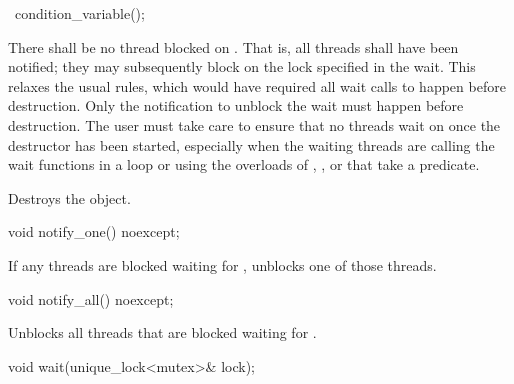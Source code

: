 %
\begin{itemdecl}
~condition_variable();
\end{itemdecl}

\begin{itemdescr}
\pnum
\precondition There shall be no thread blocked on . \enternote That is, all
threads shall have been notified; they may subsequently block on the lock specified in the
wait.
This relaxes the usual rules, which would have required all wait calls to happen before
destruction. Only the notification to unblock the wait must happen before destruction.
The user must take care to ensure that no threads wait on  once the destructor has
been started, especially when the waiting threads are calling the wait functions in a loop or
using the overloads of , , or  that take a predicate.
\exitnote

\pnum\effects Destroys the object.
\end{itemdescr}

%
%
\begin{itemdecl}
void notify_one() noexcept;
\end{itemdecl}

\begin{itemdescr}
\pnum\effects If any threads are blocked waiting for , unblocks one of those threads.
\end{itemdescr}

%
%
\begin{itemdecl}
void notify_all() noexcept;
\end{itemdecl}

\begin{itemdescr}
\pnum\effects Unblocks all threads that are blocked waiting for .
\end{itemdescr}

%
%
\begin{itemdecl}
void wait(unique_lock<mutex>& lock);
\end{itemdecl}

